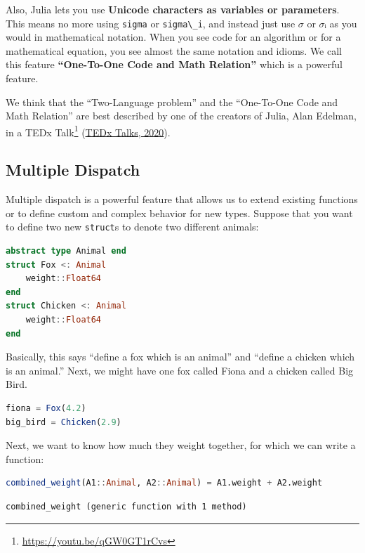 \documentclass[
  notoc %
]{tufte-book}
\DeclareRobustCommand{\href}[2]{#2\footnote{\url{#1}}}
\newcommand{\passthrough}[1]{#1}
\begin{document}
Also, Julia lets you use \textbf{Unicode characters as variables or
parameters}. This means no more using \passthrough{\lstinline!sigma!} or
\passthrough{\lstinline!sigma\_i!}, and instead just use \(σ\) or \(σᵢ\)
as you would in mathematical notation. When you see code for an
algorithm or for a mathematical equation, you see almost the same
notation and idioms. We call this feature \textbf{``One-To-One Code and
Math Relation''} which is a powerful feature.

We think that the ``Two-Language problem'' and the ``One-To-One Code and
Math Relation'' are best described by one of the creators of Julia, Alan
Edelman, in a \href{https://youtu.be/qGW0GT1rCvs}{TEDx Talk}
(\protect\hyperlink{ref-tedxtalksProgrammingLanguageHeal2020}{TEDx
Talks, 2020}).

\hypertarget{sec:multiple_dispatch}{%
\subsection{Multiple Dispatch}\label{sec:multiple_dispatch}}

Multiple dispatch is a powerful feature that allows us to extend
existing functions or to define custom and complex behavior for new
types. Suppose that you want to define two new
\passthrough{\lstinline!struct!}s to denote two different animals:

\begin{lstlisting}[language=Julia]
abstract type Animal end
struct Fox <: Animal
    weight::Float64
end
struct Chicken <: Animal
    weight::Float64
end
\end{lstlisting}

Basically, this says ``define a fox which is an animal'' and ``define a
chicken which is an animal.'' Next, we might have one fox called Fiona
and a chicken called Big Bird.

\begin{lstlisting}[language=Julia]
fiona = Fox(4.2)
big_bird = Chicken(2.9)
\end{lstlisting}

Next, we want to know how much they weight together, for which we can
write a function:

\begin{lstlisting}[language=Julia]
combined_weight(A1::Animal, A2::Animal) = A1.weight + A2.weight
\end{lstlisting}

\begin{lstlisting}[language=Output]
combined_weight (generic function with 1 method)
\end{lstlisting}
\end{document}
